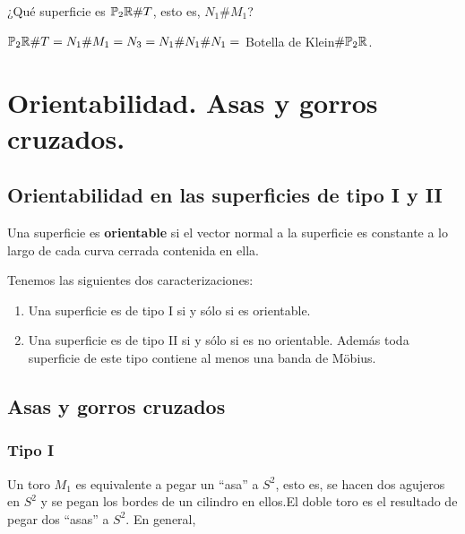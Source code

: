 \documentclass[GTSResumen.tex]{subfiles}
\begin{document}
\begin{ej}
¿Qué superficie es $\mathbb{P}_2\mathbb{R}\# T$, esto es, $N_1\# M_1$?

$\mathbb{P}_2\mathbb{R}\# T=N_1\# M_1=N_3=N_1\# N_1\# N_1=$ Botella de Klein$\#\mathbb{P}_2\mathbb{R}$.
\end{ej}

\section{Orientabilidad. Asas y gorros cruzados.}
\subsection{Orientabilidad en las superficies de tipo I y II}
\begin{defi} Una superficie es \textbf{orientable} si el vector normal a la superficie es constante a lo largo de cada curva cerrada contenida en ella.
\end{defi}
\begin{teorema} Tenemos las siguientes dos caracterizaciones:
\begin{enumerate}
\item Una superficie es de tipo I si y sólo si es orientable.
\item Una superficie es de tipo II si y sólo si es no orientable. Además toda superficie de este tipo contiene al menos una banda de Möbius.
\end{enumerate}

\end{teorema}

\subsection{Asas y gorros cruzados}
\subsubsection{Tipo I}

\begin{comment}
Sea $M_1$ y lo cortamos como se indica en la figura
\begin{figure}[h!]
	\texttt{[image: asaink]}
\end{figure}
\end{comment}
Un toro $M_1$ es equivalente a pegar un ``asa'' a $S^2$, esto es, se hacen dos agujeros en $S^2$ y se pegan los bordes de un cilindro en ellos.El doble toro es el resultado de pegar dos ``asas'' a $S^2$. En general,
\end{document}
